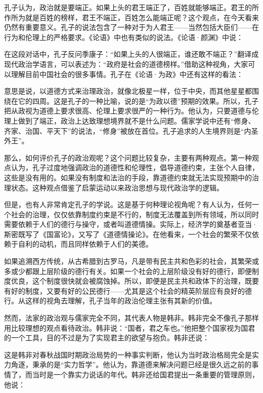 孔子认为，政治就是要端正。如果上头的君王端正了，百姓就能够端正。君王的所作所为就是百姓的榜样，君王不端正，百姓怎么能端正呢？这个观点，在今天看来仍然有重要意义。孔子的说法包含了一种对于为人君王——当然包括大臣们——在行为和伦理上的严格要求。《论语》中也有类似的说法。《论语·颜渊》中说：


在这段对话中，孔子反问季康子：“如果上头的人很端正，谁还敢不端正？”翻译成现代政治学语言，可以表述为：“政府是社会的道德榜样。”借助这种视角，大家可以理解目前中国社会的很多事情。孔子在《论语·为政》中还有这样的看法：


意思是说，以道德方式来治理政治，就像北极星一样，位于中央，而其他星星都围绕在它的四周。这是孔子的一种比喻，说的是“为政以德”预期的效果。所以，孔子把从政视为道德上要求很高、伦理上要求很严的一种行为。他认为，只要道德与伦理上做到了端正，政治上达致理想境界就不是什么问题。儒家学说中还有“修身、齐家、治国、平天下”的说法，“修身”被放在首位。孔子追求的人生境界则是“内圣外王”。

那么，如何评价孔子的政治观呢？这个问题比较复杂，主要有两种观点。第一种观点认为，孔子过度地强调政治的道德性和伦理性，倡导道德约束，主张个人自律，这些是没有用的。如果没有制度和法治的手段，靠道德约束就无法实现预期中的治理状态。这种观点借鉴了启蒙运动以来政治思想与现代政治学的逻辑。

但是，也有人非常肯定孔子的学说。这是基于何种理论视角呢？有人认为，任何一个社会的治理，仅仅依靠制度约束是不行的，制度无法覆盖到所有领域，所以同时需要依赖于人们的德行与操守，或者叫道德情操。实际上，经济学的奠基者亚当·斯密既写了《国富论》，又写了《道德情操论》。在他看来，一个社会的繁荣不仅依赖于自利的动机，而且同样依赖于人们的美德。

如果追溯西方传统，从古希腊到古罗马，凡是带有民主共和色彩的社会，其繁荣或多或少都跟上层阶级的德行有关。如果一个社会的上层阶级没有好的德行，即便制度优良，这个制度很快就会被腐蚀掉。所以，即便是民主共和政体下的治理，既要有好的制度，又要有好的公民德行——尤其是这个社会的精英阶层应有良好的德行。从这样的视角去理解，孔子当年的政治伦理主张有其新的价值。

然而，法家的政治观与儒家完全不同，其代表人物是韩非。韩非完全不像孔子那样用比较理想的观点看待政治。韩非说：“国者，君之车也。”他把整个国家视为国君的一个工具，目的不过是为了实现君主的欲望与抱负。韩非还说：


这是韩非对春秋战国时期政治局势的一种事实判断，他认为当时政治格局完全是实力角逐，秉承的是“实力哲学”。他认为，靠道德来解决问题已经是很久远之前的事情了，而当时是一个靠实力说话的年代。韩非还给国君提出一条重要的管理原则，他说：

